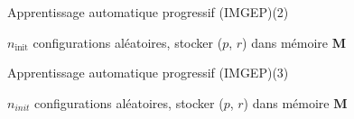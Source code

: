 \documentclass[aspectratio=43]{beamer}
\begin{document}
\begin{frame}
	\begin{alertblock}{Apprentissage automatique progressif (IMGEP)(2)}
		\begin{algorithm}[H]
			$n_\text{init}$ configurations al\'eatoires, stocker ($p$, $r$) dans m\'emoire $\mathbf{M}$\;
		\end{algorithm}	
	\end{alertblock}
\end{frame}

\begin{frame}
	\begin{alertblock}{Apprentissage automatique progressif (IMGEP)(3)}
		\begin{algorithm}[H]
			$n_{init}$ configurations al\'eatoires, stocker ($p$, $r$) dans m\'emoire $\mathbf{M}$\;

		\end{algorithm}	
	\end{alertblock}
\end{frame}
\end{document}
